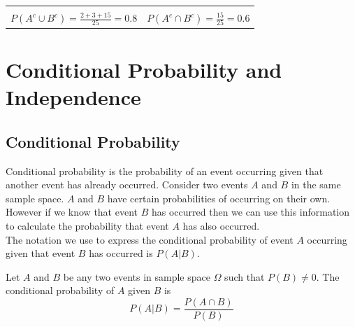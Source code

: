 \begin{example}
\begin{benumerate}
\begin{center}
\begin{tabular}{cc}
{\begin{tikzpicture}
\node[scale=2] at (0.5, 7.5) { $\Omega$ };
\node[scale=2] at (1.5, 6.5) { $A$ };
\node[scale=2] at (10.5, 6.5) { $B$ };
\node[scale=2] at (6, 4) { 5 };
\node[scale=2] at (3, 4) { 2 };
\node[scale=2] at (9, 4) { 3 };
\node[scale=2] at (11, 1) { 15 };
\end{tikzpicture}
} \\
$P(A^c \cup B^c) = \frac{2+3+15}{25} = 0.8$ & $P(A^c \cap B^c) = \frac{15}{25} = 0.6$
\end{tabular}
\end{center}
\end{benumerate}
\end{example}











\section{Conditional Probability and Independence}

\subsection{Conditional Probability}

Conditional probability is the probability of an event occurring 
given that another event has already occurred.
Consider two events $A$ and $B$ in the same sample space.
$A$ and $B$ have certain probabilities of occurring on their own.
However if we know that event $B$ has occurred 
then we can use this information to calculate the probability
that event $A$ has also occurred.\\

The notation we use to express the conditional probability 
of event $A$ occurring given that event $B$ has occurred 
is $P(A|B)$.


\begin{definition}
Let $A$ and $B$ be any two events in sample space $\Omega$
such that $P(B) \neq 0$.
The conditional probability of $A$ given $B$ is
	\begin{equation}
	P(A|B) = \frac{P(A \cap B)}{P(B)}
	\end{equation}
\end{definition}




